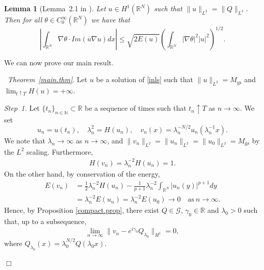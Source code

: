 \documentclass[reqno]{amsart}
\newcommand{\real}{\mathbb{R}}
\newcommand{\nat}{\mathbb{N}}
\newcommand{\rn}{\real^N}
\let\le=\leqslant
\theoremstyle{plain}
\newtheorem{lemma}{Lemma}
\theoremstyle{definition}
\numberwithin{equation}{section}
\newenvironment{proofof}
{\medskip\noindent{\it Proof of}}{\nolinebreak\hfill$\Box$\medskip}
\begin{document}
\begin{lemma}[Lemma~2.1 in \cite{banica}]\label{banica.lem}
Let $u\in H^1(\rn)$ such that $\|u\|_{L^2}=\|Q\|_{L^2}$. Then for all $\theta \in C_0^\infty(\rn)$ we have that
\[
\left|\int_{\rn} \nabla \theta\cdot Im(\overline{u}\nabla u)dx\right|
\le \sqrt{2E(u)}\left(\int_{\rn}|\nabla \theta|^2|u|^2\right)^{1/2}.
\]
\end{lemma}

We can now prove our main result.

\begin{proofof}~{\it Theorem~\ref{main.thm}}.
Let $u$ be a solution of \eqref{inls} such that $\|u\|_{L^2}=M_\mathrm{gs}$ 
and $\lim_{t\uparrow T} H(u) =+\infty$.

\medskip
\noindent
{\em Step~1.} 
Let $\{t_n\}_{n\in\nat} \subset \real$ be a sequence of times such that $t_n\uparrow T$ 
as $n\rightarrow\infty$. We set
\[
u_n=u(t_n), \quad \lambda_n^2=H(u_n), \quad v_n(x)=\lambda_n^{-N/2}u_n(\lambda_n^{-1}x).
\]
We note that $\lambda_n\rightarrow\infty$ as $n\rightarrow\infty$, 
and $\|v_n\|_{L^2}=\|u_n\|_{L^2}=\|u_0\|_{L^2}=M_\mathrm{gs}$ by the $L^2$ scaling.
Furthermore,
\[
\begin{split}
H(v_n)=\lambda_n^{-2}H(u_n)=1.
\end{split}
\]
On the other hand, by conservation of the energy,
\[
\begin{split}
E(v_n)&=\frac12\lambda_n^{-2}H(u_n)-\frac{1}{p+1}\lambda_n^{-2}\int_{\rn} |u_n(y)|^{p+1}dy\\
&=\lambda_n^{-2} E(u_n)=\lambda_n^{-2}E(u_0)\to 0 \quad \text{as} \ n\to\infty.
\end{split}
\]
Hence, by Proposition \ref{compact.prop}, there exist $Q\in\mathcal{G}$, $\gamma_0\in\real$ 
and $\lambda_0>0$ such that, up to a subsequence,
\begin{equation}\label{b}
\lim_{n\rightarrow\infty} \|v_n-e^{i\gamma_0}Q_{\lambda_0}\|_{H^1}=0,
\end{equation}
where $Q_{\lambda_0}(x)=\lambda_0^{N/2}Q(\lambda_0 x)$.


\end{proofof}
\end{document}

